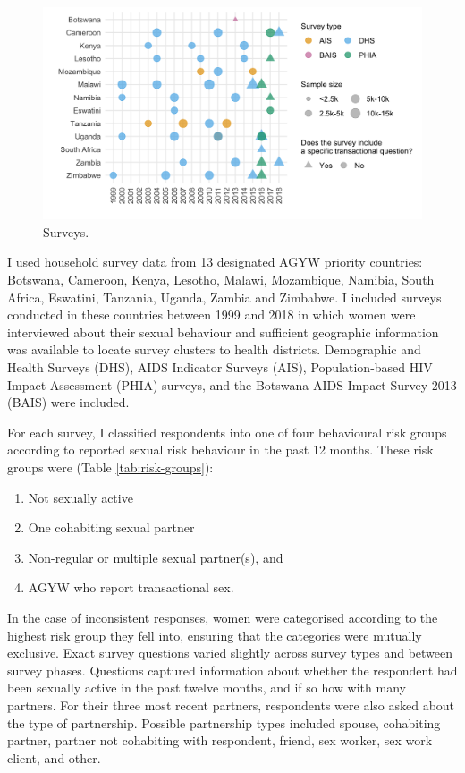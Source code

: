\documentclass[a4paper, nobind]{templates/ociamthesis}
\providecommand{\tightlist}{%
  \setlength{\itemsep}{0pt}\setlength{\parskip}{0pt}}
\begin{document}
\begin{figure}

{\centering \includegraphics[width=0.95\linewidth]{resources/multi-agyw/20230627-144735-3da88508/depends/available-surveys} 

}

\caption{Surveys.}\label{fig:available-surveys}
\end{figure}

I used household survey data from 13 designated AGYW priority countries: Botswana, Cameroon, Kenya, Lesotho, Malawi, Mozambique, Namibia, South Africa, Eswatini, Tanzania, Uganda, Zambia and Zimbabwe.
I included surveys conducted in these countries between 1999 and 2018 in which women were interviewed about their sexual behaviour and sufficient geographic information was available to locate survey clusters to health districts.
Demographic and Health Surveys (DHS), AIDS Indicator Surveys (AIS), Population-based HIV Impact Assessment (PHIA) surveys, and the Botswana AIDS Impact Survey 2013 (BAIS) were included.

For each survey, I classified respondents into one of four behavioural risk groups according to reported sexual risk behaviour in the past 12 months.
These risk groups were (Table \ref{tab:risk-groups}):

\begin{enumerate}
\def\labelenumi{\arabic{enumi}.}
\tightlist
\item
  Not sexually active
\item
  One cohabiting sexual partner
\item
  Non-regular or multiple sexual partner(s), and
\item
  AGYW who report transactional sex.
\end{enumerate}

In the case of inconsistent responses, women were categorised according to the highest risk group they fell into, ensuring that the categories were mutually exclusive.
Exact survey questions varied slightly across survey types and between survey phases.
Questions captured information about whether the respondent had been sexually active in the past twelve months, and if so how with many partners.
For their three most recent partners, respondents were also asked about the type of partnership.
Possible partnership types included spouse, cohabiting partner, partner not cohabiting with respondent, friend, sex worker, sex work client, and other.
\end{document}
